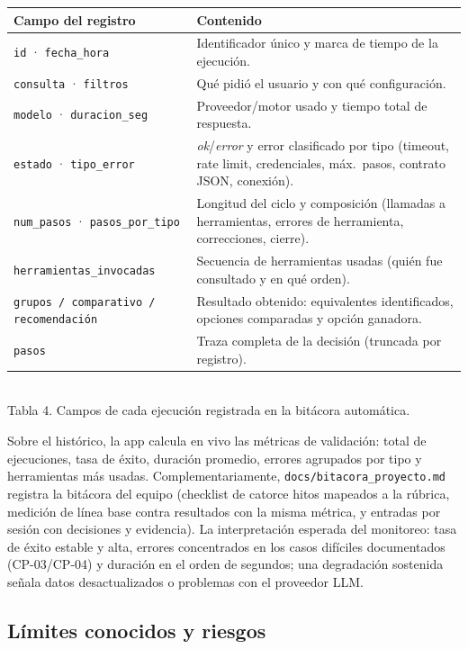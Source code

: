 \documentclass[11pt,letterpaper]{article}
\begin{document}
\begin{center}
{\small
\begin{tabular}{@{}L{4.4cm}L{10.4cm}@{}}
\toprule
\textbf{Campo del registro} & \textbf{Contenido} \\
\midrule
\texttt{id} · \texttt{fecha\_hora} & Identificador único y marca de tiempo de la ejecución. \\
\texttt{consulta} · \texttt{filtros} & Qué pidió el usuario y con qué configuración. \\
\texttt{modelo} · \texttt{duracion\_seg} & Proveedor/motor usado y tiempo total de respuesta. \\
\texttt{estado} · \texttt{tipo\_error} & \emph{ok}/\emph{error} y error clasificado por tipo
(timeout, rate limit, credenciales, máx.\ pasos, contrato JSON, conexión). \\
\texttt{num\_pasos} · \texttt{pasos\_por\_tipo} & Longitud del ciclo y composición (llamadas a
herramientas, errores de herramienta, correcciones, cierre). \\
\texttt{herramientas\_invocadas} & Secuencia de herramientas usadas (quién fue consultado y en qué
orden). \\
\texttt{grupos / comparativo / recomendación} & Resultado obtenido: equivalentes identificados,
opciones comparadas y opción ganadora. \\
\texttt{pasos} & Traza completa de la decisión (truncada por registro). \\
\bottomrule
\end{tabular}}\\[4pt]
{\small Tabla 4. Campos de cada ejecución registrada en la bitácora automática.}
\end{center}

Sobre el histórico, la app calcula en vivo las métricas de validación: total de ejecuciones, tasa de
éxito, duración promedio, errores agrupados por tipo y herramientas más usadas. Complementariamente,
\texttt{docs/bitacora\_proyecto.md} registra la bitácora del equipo (checklist de catorce hitos
mapeados a la rúbrica, medición de línea base contra resultados con la misma métrica, y entradas por
sesión con decisiones y evidencia). La interpretación esperada del monitoreo: tasa de éxito estable y
alta, errores concentrados en los casos difíciles documentados (CP-03/CP-04) y duración en el orden
de segundos; una degradación sostenida señala datos desactualizados o problemas con el proveedor LLM.

\subsection*{Límites conocidos y riesgos}
\end{document}
